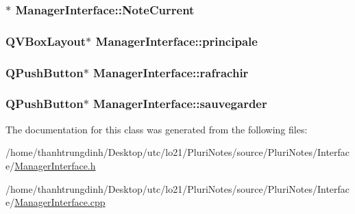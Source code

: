\subsubsection[{\texorpdfstring{Note\+Current}{NoteCurrent}}]{$\ast$ Manager\+Interface\+::\+Note\+Current\hspace{0.3cm}{\ttfamily [protected]}}\hypertarget{classManagerInterface_a1a5b770475dee3de352235687328deb3}{}\label{classManagerInterface_a1a5b770475dee3de352235687328deb3}
\subsubsection[{\texorpdfstring{principale}{principale}}]{\setlength{\rightskip}{0pt plus 5cm}Q\+V\+Box\+Layout$\ast$ Manager\+Interface\+::principale\hspace{0.3cm}{\ttfamily [protected]}}\hypertarget{classManagerInterface_adba33225f9462c38847dedf81c315809}{}\label{classManagerInterface_adba33225f9462c38847dedf81c315809}
\subsubsection[{\texorpdfstring{rafrachir}{rafrachir}}]{\setlength{\rightskip}{0pt plus 5cm}Q\+Push\+Button$\ast$ Manager\+Interface\+::rafrachir\hspace{0.3cm}{\ttfamily [protected]}}\hypertarget{classManagerInterface_a491c96cf723b10d066fe6571722cc868}{}\label{classManagerInterface_a491c96cf723b10d066fe6571722cc868}
\subsubsection[{\texorpdfstring{sauvegarder}{sauvegarder}}]{\setlength{\rightskip}{0pt plus 5cm}Q\+Push\+Button$\ast$ Manager\+Interface\+::sauvegarder\hspace{0.3cm}{\ttfamily [protected]}}\hypertarget{classManagerInterface_a2eb2db5955adc9f99eaf085d9d69e6b1}{}\label{classManagerInterface_a2eb2db5955adc9f99eaf085d9d69e6b1}


The documentation for this class was generated from the following files\+:\begin{DoxyCompactItemize}
\item 
/home/thanhtrungdinh/\+Desktop/utc/lo21/\+Pluri\+Notes/source/\+Pluri\+Notes/\+Interface/\hyperlink{ManagerInterface_8h}{Manager\+Interface.\+h}\item 
/home/thanhtrungdinh/\+Desktop/utc/lo21/\+Pluri\+Notes/source/\+Pluri\+Notes/\+Interface/\hyperlink{ManagerInterface_8cpp}{Manager\+Interface.\+cpp}\end{DoxyCompactItemize}
